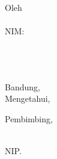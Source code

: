 
\clearpage
\pagestyle{empty}

\begin{center}

    \Large\bfseries\MakeUppercase{\judulta}

    \vfill

    \Large \subtitle

    \vfill

    \large Oleh \\[0.3em]
    \MakeUppercase{\penulis} \\[0.2em]
    NIM: \nim \\

    \prodi \\
	\normalsize \normalfont
	\fakultasplain \\
	\itb \\

    \vfill

    Bandung, \tanggallengkap\\
    Mengetahui,

    \vspace{0.5cm}

    Pembimbing,

    \vspace{3.5cm}

    \underline{\pembimbing}\\
    NIP. \nip

\end{center}

\clearpage
